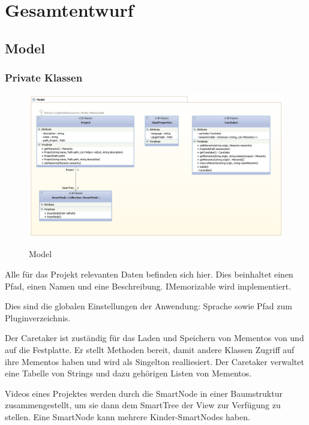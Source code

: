 \chapter{Gesamtentwurf}

\section{Model}

\subsection{Private Klassen}
\begin{figure}[h]
\noindent\includegraphics[width=\linewidth,height=\textheight,
keepaspectratio]{bilder/Modell1.png}
\label{Private Model}
\caption{Model}
\end{figure}

Alle für das Projekt relevanten Daten befinden sich hier. Dies beinhaltet einen Pfad,  einen Namen und eine Beschreibung. IMemorizable wird implementiert.


Dies sind die globalen Einstellungen der Anwendung: Sprache sowie Pfad zum Pluginverzeichnis.


Der Caretaker ist zuständig für das Laden und Speichern von Mementos von und auf die Festplatte.
Er stellt Methoden bereit, damit andere Klassen Zugriff auf ihre Mementos haben und wird als Singelton realliesiert. Der Caretaker verwaltet eine Tabelle von Strings und dazu gehörigen Listen von Mementos. 


Videos eines Projektes werden durch die SmartNode in einer Baumstruktur zusammengestellt, um sie dann dem SmartTree der View zur Verfügung zu stellen. Eine SmartNode kann mehrere Kinder-SmartNodes haben.

